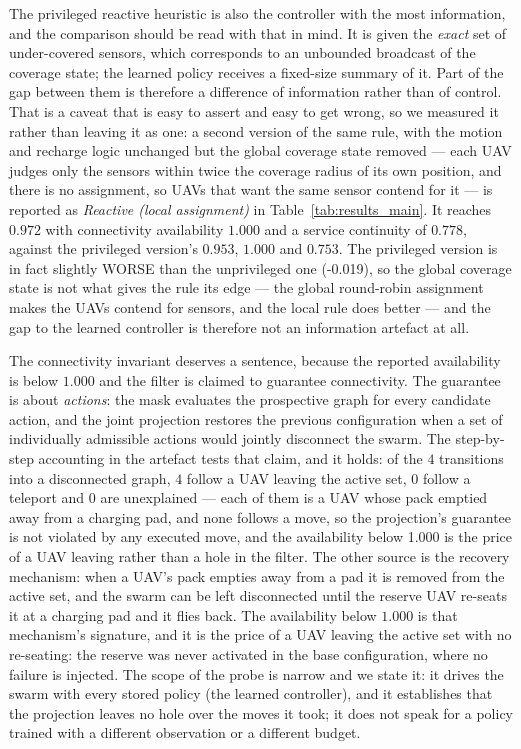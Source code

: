 The privileged reactive heuristic is also the controller with the most
information, and the comparison should be read with that in mind.  It is
given the \emph{exact} set of under-covered sensors, which corresponds to an
unbounded broadcast of the coverage state; the learned policy receives a
fixed-size summary of it.  Part of the gap between them is therefore a
difference of information rather than of control.  That is a caveat that is
easy to assert and easy to get wrong, so we measured it rather than leaving
it as one: a second version of the same rule, with the motion and recharge
logic unchanged but the global coverage state removed --- each UAV judges
only the sensors within twice the coverage radius of its own position, and
there is no assignment, so UAVs that want the same sensor contend for it
--- is reported as \emph{Reactive (local assignment)} in Table~\ref{tab:results_main}.  It
reaches $0.972$ with connectivity availability $1.000$ and
a service continuity of $0.778$, against the privileged version's
$0.953$, $1.000$ and $0.753$.  The privileged version is in fact slightly WORSE than the unprivileged one (-0.019), so the global coverage state is not what gives the rule its edge --- the global round-robin assignment makes the UAVs contend for sensors, and the local rule does better --- and the gap to the learned controller is therefore not an information artefact at all.

The connectivity invariant deserves a sentence, because the reported
availability is below $1.000$ and the filter is claimed to guarantee
connectivity.  The guarantee is about \emph{actions}: the mask evaluates
the prospective graph for every candidate action, and the joint projection
restores the previous configuration when a set of individually admissible
actions would jointly disconnect the swarm.  The step-by-step accounting
in the artefact tests that claim, and it holds: of the $4$
transitions into a disconnected graph, $4$ follow a UAV
leaving the active set, $0$ follow a teleport and
$0$ are unexplained --- each of them is a UAV whose pack emptied away from a charging pad, and none follows a move, so the projection's guarantee is not violated by any executed move, and the availability below 1.000 is the price of a UAV leaving rather than a hole in the filter.
The other source is the recovery mechanism: when a UAV's pack empties away
from a pad it is removed from the active set, and the swarm can be left
disconnected until the reserve UAV re-seats it at a charging pad and it
flies back.  The availability below $1.000$ is that mechanism's signature,
and it is the price of a UAV leaving the active set with no re-seating: the
reserve was never activated in the base configuration, where no failure is
injected.
The scope of the probe is narrow and we state it: it drives the swarm with
every stored policy (the learned controller), and it establishes that the projection leaves no hole over
the moves it took; it does not speak for a policy trained with a different
observation or a different budget.

